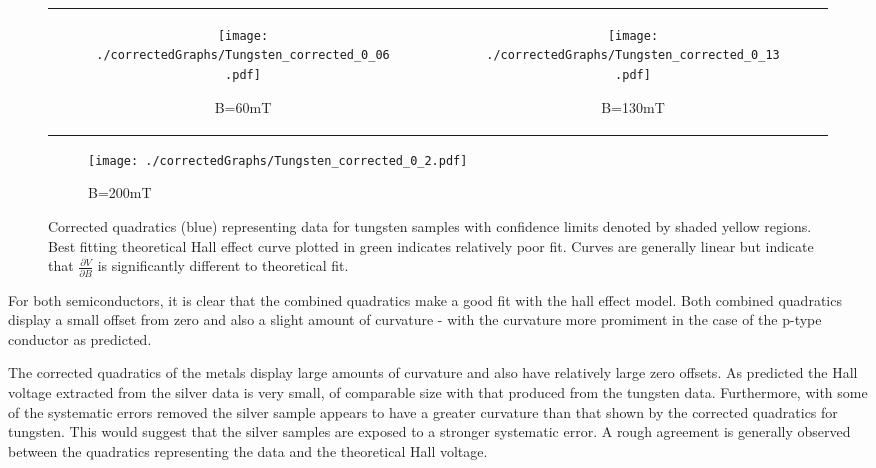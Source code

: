 \documentclass[a4paper]{article}
\begin{document}
			\begin{figure}[p]
				\centering
				\begin{tabular}{c c}
					\begin{subfigure}[t]{0.45\textwidth}
						\centering
						\texttt{[image: ./correctedGraphs/Tungsten\_corrected\_0\_06.pdf]}
						\caption{B=60mT}
						\label{fig:tungstenCorrected60}
					\end{subfigure}
					&
					\begin{subfigure}[t]{0.45\textwidth}
						\centering
						\texttt{[image: ./correctedGraphs/Tungsten\_corrected\_0\_13.pdf]}
						\caption{B=130mT}
						\label{fig:tungstenCorrected130}
					\end{subfigure}	
				\end{tabular}
				\begin{subfigure}[t]{0.45\textwidth}
					\centering
					\texttt{[image: ./correctedGraphs/Tungsten\_corrected\_0\_2.pdf]}
					\caption{B=200mT}
					\label{fig:tungstenCorrected200}
				\end{subfigure}
				
				\caption{Corrected quadratics (blue) representing data for tungsten samples with confidence limits denoted by shaded yellow regions. Best fitting theoretical Hall effect curve plotted in green indicates relatively poor fit. Curves are generally linear but indicate that $\frac{\partial V}{\partial B}$ is significantly different to theoretical fit.}
				\label{fig:tungstenCorrected}
			\end{figure}
			
			For both semiconductors, it is clear that the combined quadratics make a good fit with the hall effect model. Both combined quadratics display a small offset from zero and also a slight amount of curvature - with the curvature more promiment in the case of the p-type conductor as predicted.
			
			The corrected quadratics of the metals display large amounts of curvature and also have relatively large zero offsets. As predicted the Hall voltage extracted from the silver data is very small, of comparable size with that produced from the tungsten data. Furthermore, with some of the systematic errors removed the silver sample appears to have a greater curvature than that shown by the corrected quadratics for tungsten. This would suggest that the silver samples are exposed to a stronger systematic error. A rough agreement is generally observed between the quadratics representing the data and the theoretical Hall voltage.
			
\end{document}
